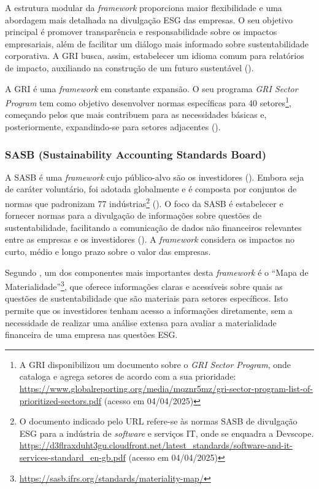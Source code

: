 A estrutura modular da \textit{framework} proporciona maior flexibilidade e uma abordagem mais detalhada na divulgação ESG das empresas. O seu objetivo principal é promover transparência e responsabilidade sobre os impactos empresariais, além de facilitar um diálogo mais informado sobre sustentabilidade corporativa. A GRI busca, assim, estabelecer um idioma comum para relatórios de impacto, auxiliando na construção de um futuro sustentável (\cite{Adams2022}).

A GRI é uma \textit{framework} em constante expansão. O seu programa \textit{GRI Sector Program} tem como objetivo desenvolver normas específicas para 40 setores\footnote{A GRI disponibilizou um documento sobre o \textit{GRI Sector Program}, onde cataloga e agrega setores de acordo com a sua prioridade: \url{https://www.globalreporting.org/media/mqznr5mz/gri-sector-program-list-of-prioritized-sectors.pdf} (acesso em 04/04/2025)}, começando pelos que mais contribuem para as necessidades básicas e, posteriormente, expandindo-se para setores adjacentes (\cite{GRISector2025}).


\subsubsection{SASB (Sustainability Accounting Standards Board)}
\label{subsubsec: SASB}

A \gls{SASB} é uma \textit{framework} cujo público-alvo são os investidores (\cite{GRISASB2021}). Embora seja de caráter voluntário, foi adotada globalmente e é composta por conjuntos de normas que padronizam 77 indústrias\footnote{O documento indicado pelo URL refere-se às normas SASB de divulgação ESG para a indústria de \textit{software} e serviços IT, onde se enquadra a Devscope. \url{https://d3flraxduht3gu.cloudfront.net/latest_standards/software-and-it-services-standard_en-gb.pdf} (acesso em 04/04/2025)} (\cite{SASB2025}). O foco da SASB é estabelecer e fornecer normas para a divulgação de informações sobre questões de sustentabilidade, facilitando a comunicação de dados não financeiros relevantes entre as empresas e os investidores (\cite{Goswami2023}). A \textit{framework} considera os impactos no curto, médio e longo prazo sobre o valor das empresas.

Segundo \cite{Cruz2023}, um dos componentes mais importantes desta \textit{framework} é o “Mapa de Materialidade”\footnote{\url{https://sasb.ifrs.org/standards/materiality-map/}}, que oferece informações claras e acessíveis sobre quais as questões de sustentabilidade que são materiais para setores específicos. Isto permite que os investidores tenham acesso a informações diretamente, sem a necessidade de realizar uma análise extensa para avaliar a materialidade financeira de uma empresa nas questões ESG.


